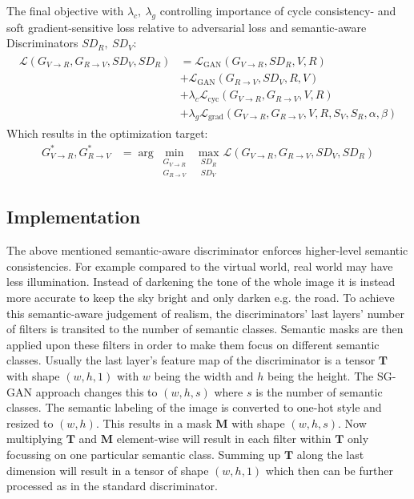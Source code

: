 The final objective with $\lambda_c, ~ \lambda_g$ controlling importance of cycle consistency- and soft gradient-sensitive loss relative to adversarial loss and semantic-aware Discriminators $SD_R,~SD_V$:
\begin{align}
	\begin{split}
		\mathcal{L}(G_{V\rightarrow R}, G_{R\rightarrow V}, SD_V, SD_R) &= \mathcal{L}_{\text{GAN}}(G_{V\rightarrow R}, SD_R, V, R)\\
		&+ \mathcal{L}_{\text{GAN}}(G_{R\rightarrow V}, SD_V, R, V)\\
		&+ \lambda_c \mathcal{L}_{\text{cyc}}(G_{V\rightarrow R}, G_{R\rightarrow V}, V, R)\\
		&+ \lambda_g \mathcal{L}_{\text{grad}}(G_{V\rightarrow R}, G_{R\rightarrow V}, V, R, S_V, S_R, \alpha, \beta)
	\end{split}
\end{align}
Which results in the optimization target:
\begin{align}
	G^*_{V\rightarrow R}, G^*_{R\rightarrow V} &= \arg \underset{\substack{G_{V\rightarrow R}\\ G_{R\rightarrow V}}}{\min}~ \underset{\substack{SD_R\\SD_V}}{\max}\mathcal{L}(G_{V\rightarrow R}, G_{R\rightarrow V}, SD_V, SD_R)
\end{align}

\subsection{Implementation}
The above mentioned semantic-aware discriminator enforces higher-level semantic consistencies. For example compared to the virtual world, real world may have less illumination. Instead of darkening the tone of the whole image it is instead more accurate to keep the sky bright and only darken e.g. the road. To achieve this semantic-aware judgement of realism, the discriminators' last layers' number of filters is transited to the number of semantic classes. Semantic masks are then applied upon these filters in order to make them focus on different semantic classes. Usually the last layer's feature map of the discriminator is a tensor $\mathbf{T}$ with shape $(w,h,1)$ with $w$ being the width and $h$ being the height. The SG-GAN approach changes this to $(w,h,s)$ where $s$ is the number of semantic classes. The semantic labeling of the image is converted to one-hot style and resized to $(w,h)$. This results in a mask $\mathbf{M}$ with shape $(w,h,s)$. Now multiplying $\mathbf{T}$ and $\mathbf{M}$ element-wise will result in each filter within $\mathbf{T}$ only focussing on one particular semantic class. Summing up $\mathbf{T}$ along the last dimension will result in a tensor of shape $(w,h,1)$ which then can be further processed as in the standard discriminator. 
